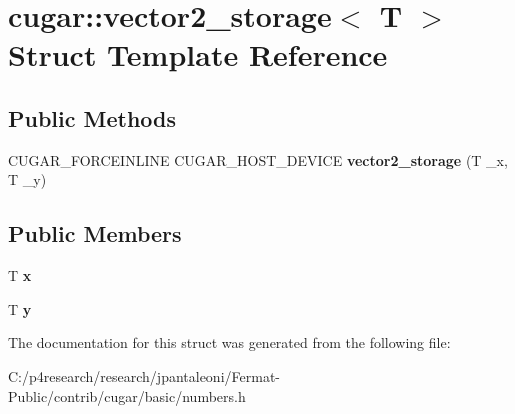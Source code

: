 \hypertarget{structcugar_1_1vector2__storage}{}\section{cugar\+:\+:vector2\+\_\+storage$<$ T $>$ Struct Template Reference}
\label{structcugar_1_1vector2__storage}
\subsection*{Public Methods}
\begin{DoxyCompactItemize}
\item 
\mbox{\label{structcugar_1_1vector2__storage_ac3abaf74278975c86efbfafb98af78de}} 
C\+U\+G\+A\+R\+\_\+\+F\+O\+R\+C\+E\+I\+N\+L\+I\+NE C\+U\+G\+A\+R\+\_\+\+H\+O\+S\+T\+\_\+\+D\+E\+V\+I\+CE {\bfseries vector2\+\_\+storage} (T \+\_\+x, T \+\_\+y)
\end{DoxyCompactItemize}
\subsection*{Public Members}
\begin{DoxyCompactItemize}
\item 
\mbox{\label{structcugar_1_1vector2__storage_ab19db509528bb50e7f6058188ea81c2d}} 
T {\bfseries x}
\item 
\mbox{\label{structcugar_1_1vector2__storage_a162416612159924a007834d3b63109f0}} 
T {\bfseries y}
\end{DoxyCompactItemize}


The documentation for this struct was generated from the following file\+:\begin{DoxyCompactItemize}
\item 
C\+:/p4research/research/jpantaleoni/\+Fermat-\/\+Public/contrib/cugar/basic/numbers.\+h\end{DoxyCompactItemize}
